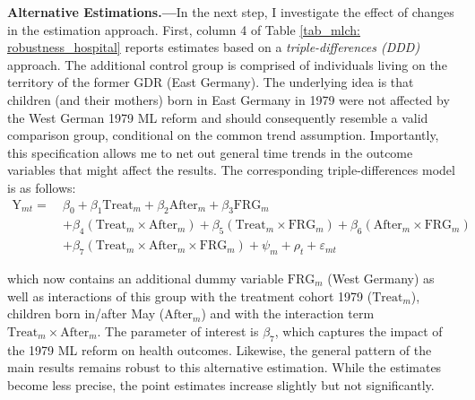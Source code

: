 

\textbf{Alternative Estimations.---}In the next step, I investigate the effect of changes in the estimation approach. First, column 4 of Table \ref{tab_mlch: robustness_hospital} reports estimates based on a \textit{triple-differences (DDD)} approach. The additional control group is comprised of individuals living on the territory of the former GDR (East Germany). The underlying idea is that children (and their mothers) born in East Germany in 1979 were not affected by the West German 1979 ML reform and should consequently resemble a valid comparison group, conditional on the common trend assumption. Importantly, this specification allows me to net out general time trends in the outcome variables that might affect the results. The corresponding triple-differences model is as follows:
\begin{align}
\text{Y}_{mt} =\ &\beta_0 + \beta_1 \text{Treat}_{m} + \beta_2 \text{After}_{m} + \beta_3 \text{FRG}_m \nonumber\\&+ \beta_4 (\text{Treat}_{m} \times \text{After}_{m}) + \beta_5 (\text{Treat}_m \times \text{FRG}_m) + \beta_6 (\text{After}_m \times \text{FRG}_m) \nonumber\\ &+ \beta_7 (\text{Treat}_m\times \text{After}_m\times \text{FRG}_m) + \psi_m + \rho_t + \varepsilon_{mt} \label{eq_mlch:DDD}
\end{align}

which now contains an additional dummy variable $\text{FRG}_m$ (West Germany) as well as interactions of this group with the treatment cohort 1979 ($\text{Treat}_{m}$), children born in/after May ($\text{After}_{m}$) and with the interaction term $\text{Treat}_{m} \times \text{After}_{m}$. The parameter of interest is $\beta_7$, which captures the impact of the 1979 ML reform on health outcomes. Likewise, the general pattern of the main results remains robust to this alternative estimation. While the estimates become less precise, the point estimates increase slightly but not significantly.


